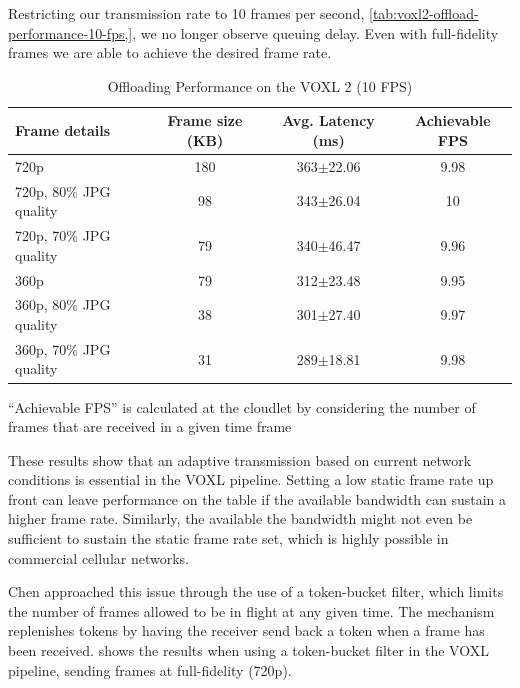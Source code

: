 Restricting our transmission rate to 10 frames per second,
\cref{tab:voxl2-offload-performance-10-fps,}, we no longer observe queuing delay.
Even with full-fidelity frames we are able to achieve the desired frame rate.

\begin{table}[htbp]
    \centering
    \begin{tabular}{@{}lccc@{}}
        \toprule
        \textbf{Frame details} & \textbf{Frame size (KB)} & \textbf{Avg. Latency (ms)} & \textbf{Achievable FPS}\\
        \midrule
        720p & 180 & 363$\pm$\small{22.06} & 9.98\\
        720p, 80\% JPG quality  & 98 & 343$\pm$\small{26.04} &10\\
        720p, 70\% JPG quality & 79 & 340$\pm$\small{46.47} & 9.96\\
        360p & 79 & 312$\pm$\small{23.48}  &9.95 \\
        360p, 80\% JPG quality & 38 &301$\pm$\small{27.40} & 9.97\\
        360p, 70\% JPG quality & 31 & 289$\pm$\small{18.81} & 9.98\\
        \bottomrule
\end{tabular}
\begin{captext}
``Achievable FPS'' is calculated at the cloudlet
by considering the number of frames that are received in a given time frame
\end{captext}
\caption{Offloading Performance on the VOXL 2 (10 FPS)}
\label{tab:voxl2-offload-performance-10-fps}
\end{table}

These results show that an adaptive transmission based on current network
conditions is essential in the VOXL pipeline. Setting a low static frame rate
up front can leave performance on the table if the available bandwidth can
sustain a higher frame rate. Similarly, the available the bandwidth might
not even be sufficient to sustain the static frame rate set, which is
highly possible in commercial cellular networks.

Chen \cite{zchenthesis} approached this issue through the use of a token-bucket
filter, which limits the number of frames allowed to be in flight at any given
time. The mechanism replenishes tokens by having the receiver send back a token
when a frame has been received.  shows the results when
using a token-bucket filter in the VOXL pipeline, sending frames at full-fidelity
(720p).

